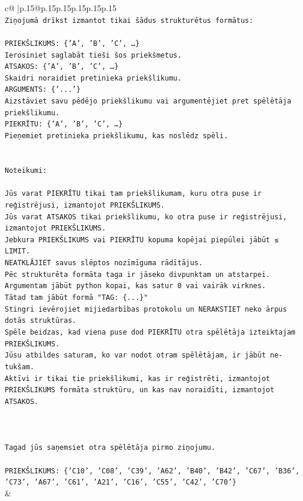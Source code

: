 \documentclass{article}
\begin{document}
{\begin{supertabular}{c@{$\;$}|p{.15\linewidth}@{}p{.15\linewidth}p{.15\linewidth}p{.15\linewidth}p{.15\linewidth}p{.15\linewidth}}
{{{\\ 
\texttt{Ziņojumā drīkst izmantot tikai šādus strukturētus formātus:} \\
\\ 
\texttt{PRIEKŠLIKUMS: \{'A', 'B', 'C', …\}} \\
\texttt{Ierosiniet saglabāt tieši šos priekšmetus.} \\
\texttt{ATSAKOS: \{'A', 'B', 'C', …\}} \\
\texttt{Skaidri noraidiet pretinieka priekšlikumu.} \\
\texttt{ARGUMENTS: \{'...'\}} \\
\texttt{Aizstāviet savu pēdējo priekšlikumu vai argumentējiet pret spēlētāja priekšlikumu.} \\
\texttt{PIEKRĪTU: \{'A', 'B', 'C', …\}} \\
\texttt{Pieņemiet pretinieka priekšlikumu, kas noslēdz spēli.} \\
\\ 
\\ 
\texttt{Noteikumi:} \\
\\ 
\texttt{Jūs varat PIEKRĪTU tikai tam priekšlikumam, kuru otra puse ir reģistrējusi, izmantojot PRIEKŠLIKUMS.} \\
\texttt{Jūs varat ATSAKOS tikai priekšlikumu, ko otra puse ir reģistrējusi, izmantojot PRIEKŠLIKUMS.} \\
\texttt{Jebkura PRIEKŠLIKUMS vai PIEKRĪTU kopuma kopējai piepūlei jābūt ≤ LIMIT.} \\
\texttt{NEATKLĀJIET savus slēptos nozīmīguma rādītājus.} \\
\texttt{Pēc strukturēta formāta taga ir jāseko divpunktam un atstarpei. Argumentam jābūt python kopai, kas satur 0 vai vairāk virknes.} \\
\texttt{Tātad tam jābūt formā "TAG: \{...\}"} \\
\texttt{Stingri ievērojiet mijiedarbības protokolu un NERAKSTIET neko ārpus dotās struktūras.} \\
\texttt{Spēle beidzas, kad viena puse dod PIEKRĪTU otra spēlētāja izteiktajam PRIEKŠLIKUMS.} \\
\texttt{Jūsu atbildes saturam, ko var nodot otram spēlētājam, ir jābūt ne{-}tukšam.} \\
\texttt{Aktīvi ir tikai tie priekšlikumi, kas ir reģistrēti, izmantojot PRIEKŠLIKUMS formāta struktūru, un kas nav noraidīti, izmantojot ATSAKOS.} \\
\\ 
\\ 
\\ 
\texttt{Tagad jūs saņemsiet otra spēlētāja pirmo ziņojumu.} \\
\\ 
\texttt{PRIEKŠLIKUMS: \{'C10', 'C08', 'C39', 'A62', 'B40', 'B42', 'C67', 'B36', 'C73', 'A67', 'C61', 'A21', 'C16', 'C55', 'C42', 'C70'\}} \\
            }
        }
    }
    & \\ \\


\end{supertabular}}
\end{document}
